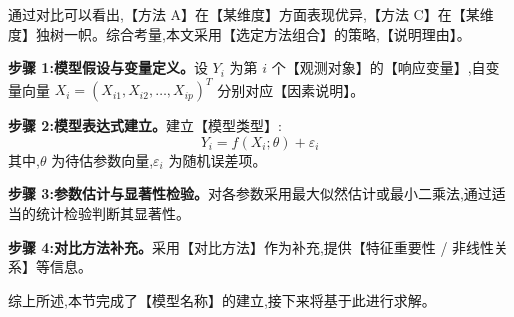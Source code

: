 通过对比可以看出,【方法 A】在【某维度】方面表现优异,【方法 C】在【某维度】独树一帜。综合考量,本文采用【选定方法组合】的策略,【说明理由】。

\textbf{步骤 1:模型假设与变量定义。}设 $Y_i$ 为第 $i$ 个【观测对象】的【响应变量】,自变量向量 $X_i = (X_{i1}, X_{i2}, \ldots, X_{ip})^T$ 分别对应【因素说明】。

\textbf{步骤 2:模型表达式建立。}建立【模型类型】:
\begin{equation}
Y_i = f(X_i; \theta) + \varepsilon_i \label{eq:model_q1}
\end{equation}
其中,$\theta$ 为待估参数向量,$\varepsilon_i$ 为随机误差项。

\textbf{步骤 3:参数估计与显著性检验。}对各参数采用最大似然估计或最小二乘法,通过适当的统计检验判断其显著性。

\textbf{步骤 4:对比方法补充。}采用【对比方法】作为补充,提供【特征重要性 / 非线性关系】等信息。

综上所述,本节完成了【模型名称】的建立,接下来将基于此进行求解。
